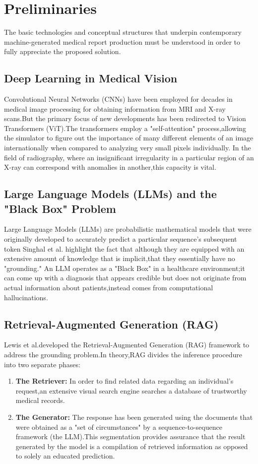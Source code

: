 \section{Preliminaries}
The basic technologies and conceptual structures that underpin contemporary machine-generated medical report production must be understood in order to fully appreciate the proposed solution.

\subsection{Deep Learning in Medical Vision}
Convolutional Neural Networks (CNNs) have been employed for decades in medical image 
processing for obtaining information from MRI and X-ray scans.But the primary focus of new 
developments has been redirected to Vision Transformers (ViT).The transformers employ a 
"self-attention" process,allowing the simulator to figure out the importance of many different 
elements of an image internationally when compared to analyzing very small pixels individually. 
In the field of radiography, where an insignificant irregularity in a particular region of an X-ray 
can correspond with anomalies in another,this capacity is vital. 
\subsection{Large Language Models (LLMs) and the "Black Box" Problem }
Large Language Models (LLMs) are probabilistic mathematical models that were originally 
developed to accurately predict a particular sequence's subsequent token Singhal et al\cite{Singhal2022}. 
highlight the fact that although they are equipped with an extensive amount of knowledge that is 
implicit,that they essentially have no "grounding." An LLM operates as a "Black Box" in a 
healthcare environment;it can come up with a diagnosis that appears credible but does not 
originate from actual information about patients,instead comes from computational 
hallucinations. 

\subsection{Retrieval-Augmented Generation (RAG)} Lewis et al.\cite{Lewis2020}developed the Retrieval-Augmented Generation (RAG) framework to address the grounding problem.In theory,RAG divides the inference procedure into two separate phases:\begin{enumerate} \item \textbf{The Retriever:} In order to find related data regarding an individual's request,an extensive visual search engine searches a database of trustworthy medical records.\item \textbf{The Generator:} The response has been generated using the documents that were obtained as a "set of circumstances" by a sequence-to-sequence framework (the LLM).This segmentation provides assurance that the result generated by the model is a compilation of retrieved information as opposed to solely an educated prediction.\end{enumerate}
